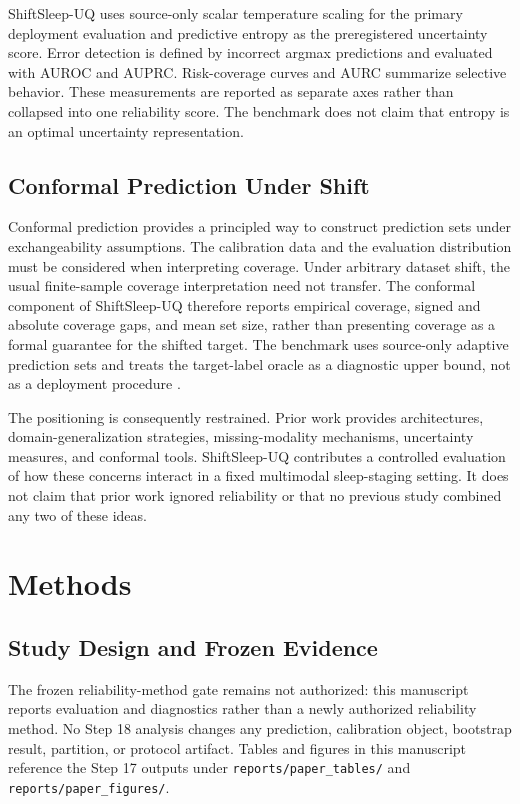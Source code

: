 \documentclass[10pt,twocolumn]{article}
\begin{document}
ShiftSleep-UQ uses source-only scalar temperature scaling for the primary deployment evaluation and predictive entropy as the preregistered uncertainty score. Error detection is defined by incorrect argmax predictions and evaluated with AUROC and AUPRC. Risk-coverage curves and AURC summarize selective behavior. These measurements are reported as separate axes rather than collapsed into one reliability score. The benchmark does not claim that entropy is an optimal uncertainty representation.

\subsection{Conformal Prediction Under Shift}
Conformal prediction provides a principled way to construct prediction sets under exchangeability assumptions. The calibration data and the evaluation distribution must be considered when interpreting coverage. Under arbitrary dataset shift, the usual finite-sample coverage interpretation need not transfer. The conformal component of ShiftSleep-UQ therefore reports empirical coverage, signed and absolute coverage gaps, and mean set size, rather than presenting coverage as a formal guarantee for the shifted target. The benchmark uses source-only adaptive prediction sets and treats the target-label oracle as a diagnostic upper bound, not as a deployment procedure \citep{angelopoulos2023conformal,dey2023conformalordinal}.

The positioning is consequently restrained. Prior work provides architectures, domain-generalization strategies, missing-modality mechanisms, uncertainty measures, and conformal tools. ShiftSleep-UQ contributes a controlled evaluation of how these concerns interact in a fixed multimodal sleep-staging setting. It does not claim that prior work ignored reliability or that no previous study combined any two of these ideas.

\section{Methods}
\subsection{Study Design and Frozen Evidence}
The frozen reliability-method gate remains not authorized: this manuscript reports evaluation and diagnostics rather than a newly authorized reliability method. No Step 18 analysis changes any prediction, calibration object, bootstrap result, partition, or protocol artifact. Tables and figures in this manuscript reference the Step 17 outputs under \texttt{reports/paper\_tables/} and \texttt{reports/paper\_figures/}.
\end{document}
